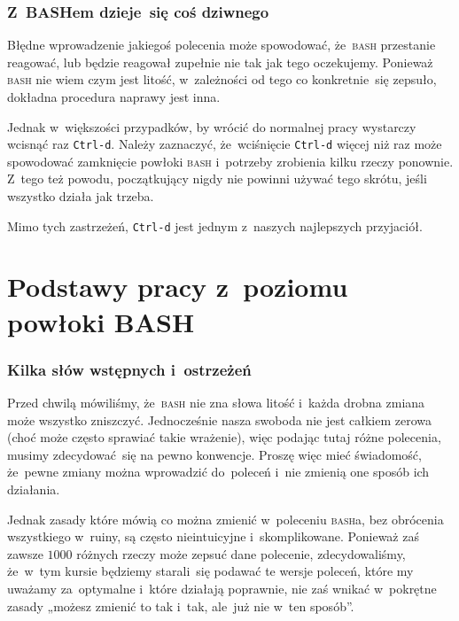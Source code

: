 \documentclass[10pt,t]{beamer}
\begin{document}
\begin{frame}
  \frametitle{Z~BASHem dzieje~się coś dziwnego}


  Błędne wprowadzenie jakiegoś polecenia może spowodować, że~\textsc{bash}
  przestanie reagować, lub będzie reagował zupełnie nie tak jak tego
  oczekujemy. Ponieważ \textsc{bash} nie wiem czym jest litość, w~zależności
  od tego co konkretnie~się zepsuło, dokładna procedura naprawy jest inna.

  Jednak w~większości przypadków, by wrócić do normalnej pracy wystarczy
  wcisnąć \alert{raz} \texttt{Ctrl-d}. Należy zaznaczyć, że~wciśnięcie
  \texttt{Ctrl-d} \alert{więcej niż raz} może spowodować zamknięcie powłoki
  \textsc{bash} i~potrzeby zrobienia kilku rzeczy ponownie. Z~tego też
  powodu, początkujący \alert{nigdy} nie powinni używać tego skrótu, jeśli
  wszystko działa jak trzeba.

  Mimo tych zastrzeżeń, \texttt{Ctrl-d} jest jednym z~naszych najlepszych
  przyjaciół.

\end{frame}










\section{Podstawy pracy z~poziomu powłoki BASH}



\begin{frame}
  \frametitle{Kilka słów wstępnych i~ostrzeżeń}


  Przed chwilą mówiliśmy, że~\textsc{bash} nie zna słowa litość i~każda
  drobna zmiana może wszystko zniszczyć. Jednocześnie nasza swoboda nie jest
  całkiem zerowa (choć może często sprawiać takie wrażenie), więc
  podając tutaj różne polecenia, musimy zdecydować~się na pewno konwencje.
  Proszę więc mieć świadomość, że~\alert{pewne} zmiany można wprowadzić
  do~poleceń i~nie zmienią one sposób ich działania.

  Jednak zasady które mówią co \alert{można} zmienić w~poleceniu
  \textsc{bash}a, bez obrócenia wszystkiego w~ruiny, są często nieintuicyjne
  i~skomplikowane. Ponieważ zaś zawsze $1000$ różnych rzeczy może zepsuć
  dane polecenie, zdecydowaliśmy, że~w~tym kursie będziemy starali~się
  podawać te wersje poleceń, które my uważamy za~optymalne i~które działają
  poprawnie, nie zaś wnikać w~pokrętne zasady „możesz zmienić to tak i~tak,
  ale~już nie w~ten sposób”.

\end{frame}
\end{document}
